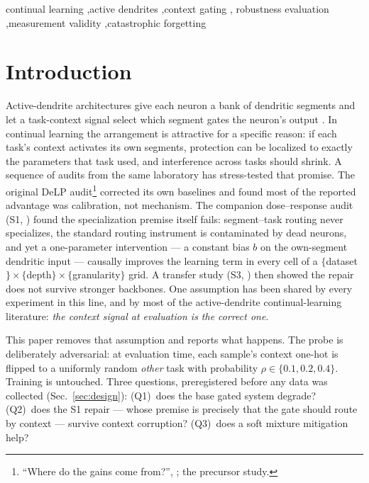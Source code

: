 \documentclass[review,12pt,number]{elsarticle}
\begin{document}
\begin{frontmatter}
\begin{keyword}
continual learning \sep active dendrites \sep context gating \sep
robustness evaluation \sep measurement validity \sep catastrophic
forgetting
\end{keyword}

\end{frontmatter}

\section{Introduction}
\label{sec:intro}

Active-dendrite architectures give each neuron a bank of dendritic
segments and let a task-context signal select which segment gates the
neuron's output
\cite{iyer2022,boahen2022,poirazi2020}. In continual learning the
arrangement is attractive for a specific reason: if each task's context
activates its own segments, protection can be localized to exactly the
parameters that task used, and interference across tasks should shrink.
A sequence of audits from the same laboratory has stress-tested that
promise. The original DeLP audit\footnote{``Where do the gains come
from?'', \cite{zhou2026audit}; the precursor study.} corrected its own
baselines and found most of the reported advantage was calibration, not
mechanism. The companion dose--response audit (S1,
\cite{zhou2026delpS1}) found the specialization premise itself fails:
segment--task routing never specializes, the standard routing instrument
is contaminated by dead neurons, and yet a one-parameter intervention ---
a constant bias $b$ on the own-segment dendritic input --- causally
improves the learning term in every cell of a
$\{$dataset$\}\times\{$depth$\}\times\{$granularity$\}$ grid. A transfer
study (S3, \cite{zhou2026repair}) then showed the repair does not survive
stronger backbones. One assumption has been shared by every experiment in
this line, and by most of the active-dendrite continual-learning
literature: \emph{the context signal at evaluation is the correct one}.

This paper removes that assumption and reports what happens. The probe is
deliberately adversarial: at evaluation time, each sample's context
one-hot is flipped to a uniformly random \emph{other} task with
probability $\rho \in \{0.1, 0.2, 0.4\}$. Training is untouched. Three
questions, preregistered before any data was collected
(Sec.~\ref{sec:design}): (Q1)~does the base gated system degrade?
(Q2)~does the S1 repair --- whose premise is precisely that the gate
should route by context --- survive context corruption? (Q3)~does a soft
mixture mitigation help?
\end{document}
